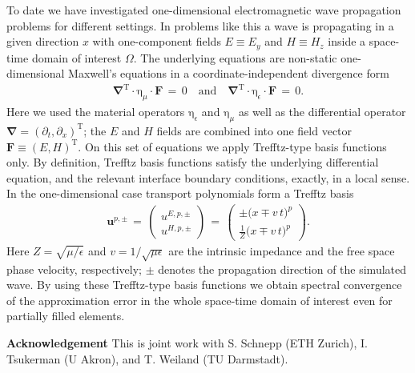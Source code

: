\documentclass[article, A4, 11pt]{llncs}%
\begin{document}
To date we have investigated one-dimensional electromagnetic wave propagation problems for different settings. In problems like this a wave is propagating in a given direction $x$ with one-component fields $E\equiv E_y$ and $H\equiv H_z$ inside a space-time domain of interest $\Omega$. The underlying equations are non-static one-dimensional Maxwell's equations in a coordinate-independent divergence form
\begin{align} \label{eqn:1D-Maxwell-compact-form}  \mathbf{\nabla}^{\mathrm{T}} \cdot \mathrm{\eta}_\mu \cdot \mathbf{F} \,=\, 0 \quad \mathrm{and} \quad \mathbf{\nabla}^{\mathrm{T}} \cdot \mathrm{\eta}_\epsilon \cdot  \mathbf{F} \,=\, 0.\end{align} 
Here we used the material operators $\mathrm{\eta}_\epsilon $ and $\mathrm{\eta}_\mu$ as well as the differential operator $\mathbf{\nabla}=(\partial_t,\partial_x)^{\mathrm{T}}$; the $E$ and $H$ fields are combined into one field vector $\mathbf{F} \equiv (E,H)^{\mathrm{T}}$. On this set of equations we apply Trefftz-type basis functions only. By definition, Trefftz basis functions satisfy the underlying differential equation, and the relevant interface boundary conditions, exactly, in a local sense. In the one-dimensional case transport polynomials form a Trefftz basis
\begin{align}\label{eqn:transport-basis}  \mathbf{u}^{p,\pm} \, = \,   \left(\begin{array}{c}  u^{E,p,\pm} \\u^{H,p,\pm}  \end{array}\right) \, = \,  \left(\begin{array}{c}  \pm \big( x \mp v \, t \big)^p \\ \frac{1}{Z} \big( x \mp v \, t \big)^p  \end{array}\right).\end{align}  
Here $Z = \sqrt{\mu  / \epsilon}$ and $v = 1 / \sqrt{\mu \epsilon}$ are the intrinsic impedance and the free space phase velocity, respectively; $\pm$ denotes the propagation direction of the simulated wave. By using these Trefftz-type basis functions we obtain spectral convergence of the approximation error in the whole space-time domain of interest even for partially filled elements. 

\textbf{Acknowledgement} This is joint work with S. Schnepp (ETH Zurich), I. Tsukerman (U Akron), and T. Weiland (TU Darmstadt).
\end{document}
